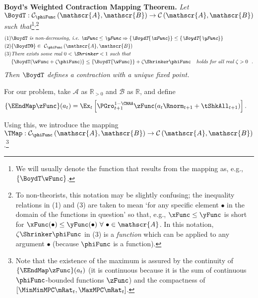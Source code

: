 \documentclass[BufferStockTheory]{subfiles}
\begin{document}
\textbf{Boyd's Weighted Contraction Mapping Theorem.} \textit{Let $\BoydT:\mathcal{C}_{\phiFunc }\left( \mathscr{A},\mathscr{B}\right)
  \rightarrow \mathcal{C}\left( \mathscr{A},\mathscr{B}\right) $ such
  that}\footnote{We will usually denote the function that results from the mapping as, e.g., $\{\BoydT\wFunc\}$.}\textsuperscript{,}\footnote{To non-theorists, this notation may be slightly confusing; the inequality relations in (1) and (3) are taken to mean `for any specific element $\bullet$ in the domain of the functions in question' so that, e.g., $\xFunc \leq \yFunc$ is short for $\xFunc(\bullet) \leq \yFunc(\bullet)~\forall~\bullet\in \mathscr{A}$.  In this notation, $\zeta \Shrinker \phiFunc$ in (3) is a \textit{function} which can be applied to any argument $\bullet$ (because $\phiFunc$ is a function).} \nopagebreak
\begin{align*}
  \mbox{(1)} &\BoydT%
               \mbox{ \textit{is non-decreasing, i.e.\ ${\xFunc} \leq {\yFunc}\Rightarrow
               \{\BoydT{\xFunc}\} \leq \{\BoydT{\yFunc}\}$}}   \nonumber \\
  \mbox{(2)} & \{\BoydT\mathbf{0}\}\in ~ \mathcal{C}_{\phiFunc }\left(\mathscr{A},\mathscr{B}\right)  \notag \\
  \mbox{(3)}
             & \mbox{\textit{There exists some real $0 < \Shrinker < 1$ such that}} \\
             & \{\BoydT({\wFunc} +\zeta\phiFunc )\} \leq \{\BoydT{\wFunc}\} +\zeta\Shrinker \phiFunc
               \mbox{ \textit{~~holds for all real $\zeta > 0$ } } .
\end{align*}
\textit{Then $\BoydT$ defines a contraction with a unique fixed point.}

For our problem, take $\mathscr{A}$ as $\mathbb{R}_{>0}$ and $\mathscr{B}$
as $\mathbb{R}$, and define
\begin{align*}
  \{\EEndMap \zFunc\}(a_{t})  & = \Ex_{t}\left[\PGro^{1-\CRRA}_{t+1} \zFunc(a_{t} \Rnorm_{t+1} + \tShkAll_{t+1})\right].
\end{align*}

Using this, we introduce the mapping \textit{$\TMap:\mathcal{C}_{\phiFunc }\left( \mathscr{A},\mathscr{B}\right) \rightarrow \mathcal{C}\left( \mathscr{A},\mathscr{B}\right) $}.\footnote{Note that the existence of the maximum is assured by the continuity of $\{\EEndMap \zFunc\}(a_{t})$ (it is continuous because it is the sum of continuous $\phiFunc$-bounded functions $\zFunc$) and the compactness of $[\MinMinMPC \mRat_{t}, \MaxMPC \mRat_{t}]$.}
\end{document}
